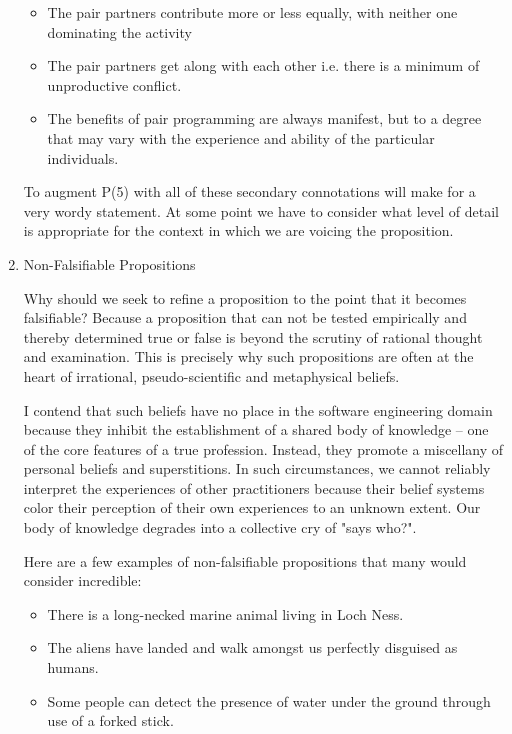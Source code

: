 \documentclass{article}
\begin{document}
\begin{enumerate}
\begin{itemize}
\item The pair partners contribute more or less equally, with neither one
dominating the activity
\item The pair partners get along with each other i.e. there is a minimum
of unproductive conflict.
\item The benefits of pair programming are always manifest, but to a degree
that may vary with the experience and ability of the particular
individuals.
\end{itemize}

To augment P(5) with all of these secondary connotations will make for a
very wordy statement. At some point we have to consider what level of
detail is appropriate for the context in which we are voicing the
proposition.

\item Non-Falsifiable Propositions
\label{sec:orgheadline362}

Why should we seek to refine a proposition to the point that it becomes
falsifiable? Because a proposition that can not be tested empirically
and thereby determined true or false is beyond the scrutiny of rational
thought and examination. This is precisely why such propositions are
often at the heart of irrational, pseudo-scientific and metaphysical
beliefs.

I contend that such beliefs have no place in the software engineering
domain because they inhibit the establishment of a shared body of
knowledge -- one of the core features of a true profession. Instead,
they promote a miscellany of personal beliefs and superstitions. In such
circumstances, we cannot reliably interpret the experiences of other
practitioners because their belief systems color their perception of
their own experiences to an unknown extent. Our body of knowledge
degrades into a collective cry of "says who?".

Here are a few examples of non-falsifiable propositions that many would
consider incredible:

\begin{itemize}
\item There is a long-necked marine animal living in Loch Ness.
\item The aliens have landed and walk amongst us perfectly disguised as
humans.
\item Some people can detect the presence of water under the ground through
use of a forked stick.
\end{itemize}


\end{enumerate}
\end{document}
